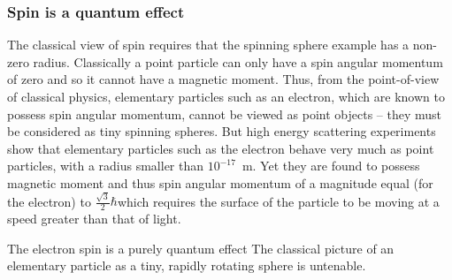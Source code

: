 \begin{frame}
\frametitle{Spin is a quantum effect}
 
The classical view of spin requires that the spinning sphere example has a non-zero radius. Classically a point particle can only have a spin angular momentum of zero and so it cannot have a magnetic moment. Thus, from the point-of-view of classical physics, elementary particles such as an electron, which are known to possess spin angular momentum, cannot be viewed as point objects -- they must be considered as tiny spinning spheres. But high energy scattering experiments show that \alert{elementary particles such as the electron behave very much as point particles}, with a radius smaller than $10^{-17}$~m. Yet they are found to possess magnetic moment and thus spin angular momentum of a magnitude equal (for the electron) to 
$\frac{\sqrt{3}}{2} \hbar$which requires the surface of the particle to be moving at a speed greater than that of light. 
 
\begin{alertblock}{The electron spin is a purely quantum effect}
The classical picture of an elementary particle as a tiny, rapidly rotating sphere is untenable.
\end{alertblock}
 \end{frame}
